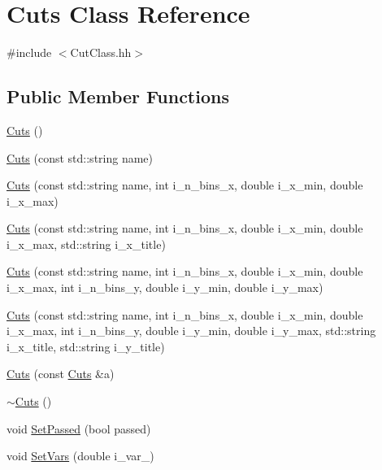 \section{Cuts Class Reference}
\label{classCuts}


{\ttfamily \#include $<$Cut\-Class.\-hh$>$}

\subsection*{Public Member Functions}
\begin{DoxyCompactItemize}
\item 
\hyperlink{classCuts_a8c24c150ccef259ae6ebc3051dc32658}{Cuts} ()
\item 
\hyperlink{classCuts_a7b563df83f6e6bfabc4d605d5a809aca}{Cuts} (const std\-::string name)
\item 
\hyperlink{classCuts_a8d012671d52feca2353658e81bb5055c}{Cuts} (const std\-::string name, int i\-\_\-n\-\_\-bins\-\_\-x, double i\-\_\-x\-\_\-min, double i\-\_\-x\-\_\-max)
\item 
\hyperlink{classCuts_afc57873c550bee21a77e747d0c647f44}{Cuts} (const std\-::string name, int i\-\_\-n\-\_\-bins\-\_\-x, double i\-\_\-x\-\_\-min, double i\-\_\-x\-\_\-max, std\-::string i\-\_\-x\-\_\-title)
\item 
\hyperlink{classCuts_adc1fca90f6426f31e3100e4ea2bd31fe}{Cuts} (const std\-::string name, int i\-\_\-n\-\_\-bins\-\_\-x, double i\-\_\-x\-\_\-min, double i\-\_\-x\-\_\-max, int i\-\_\-n\-\_\-bins\-\_\-y, double i\-\_\-y\-\_\-min, double i\-\_\-y\-\_\-max)
\item 
\hyperlink{classCuts_abee935c038cbfe00a40510326334c393}{Cuts} (const std\-::string name, int i\-\_\-n\-\_\-bins\-\_\-x, double i\-\_\-x\-\_\-min, double i\-\_\-x\-\_\-max, int i\-\_\-n\-\_\-bins\-\_\-y, double i\-\_\-y\-\_\-min, double i\-\_\-y\-\_\-max, std\-::string i\-\_\-x\-\_\-title, std\-::string i\-\_\-y\-\_\-title)
\item 
\hyperlink{classCuts_a8bb350e9c40023b113fb7dc145e8b897}{Cuts} (const \hyperlink{classCuts}{Cuts} \&a)
\item 
\hyperlink{classCuts_a2562d8d0e6ef06fe240e345b779e2b1a}{$\sim$\-Cuts} ()
\item 
void \hyperlink{classCuts_a773e5d0750471fd309c67f8ee0c4f63d}{Set\-Passed} (bool passed)
\item 
void \hyperlink{classCuts_a97c553e56acebf56a62b0261b1d1b20b}{Set\-Vars} (double i\-\_\-var\-\_)
\item 

\end{DoxyCompactItemize}
